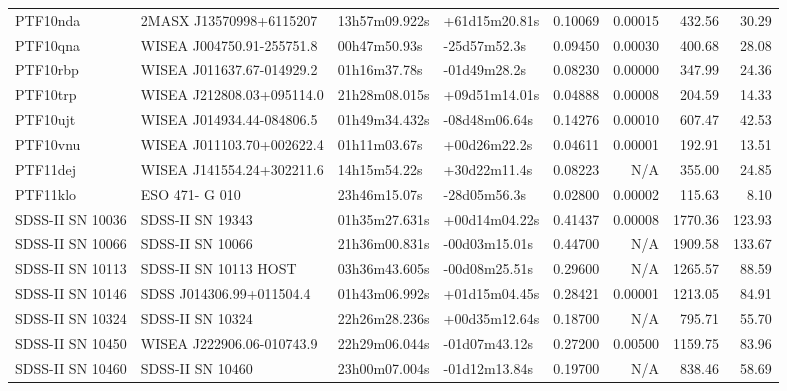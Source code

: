 \begin{longtable}{llllrrrr}
PTF10nda         &         2MASX J13570998+6115207 &   13h57m09.922s &   +61d15m20.81s &  0.10069 &  0.00015 &   432.56 &       30.29 \\
PTF10qna         &       WISEA J004750.91-255751.8 &    00h47m50.93s &    -25d57m52.3s &  0.09450 &  0.00030 &   400.68 &       28.08 \\
PTF10rbp         &       WISEA J011637.67-014929.2 &    01h16m37.78s &    -01d49m28.2s &  0.08230 &  0.00000 &   347.99 &       24.36 \\
PTF10trp         &       WISEA J212808.03+095114.0 &   21h28m08.015s &   +09d51m14.01s &  0.04888 &  0.00008 &   204.59 &       14.33 \\
PTF10ujt         &       WISEA J014934.44-084806.5 &   01h49m34.432s &   -08d48m06.64s &  0.14276 &  0.00010 &   607.47 &       42.53 \\
PTF10vnu         &       WISEA J011103.70+002622.4 &    01h11m03.67s &    +00d26m22.2s &  0.04611 &  0.00001 &   192.91 &       13.51 \\
PTF11dej         &       WISEA J141554.24+302211.6 &    14h15m54.22s &    +30d22m11.4s &  0.08223 &      N/A &   355.00 &       24.85 \\
PTF11klo         &                  ESO 471- G 010 &    23h46m15.07s &    -28d05m56.3s &  0.02800 &  0.00002 &   115.63 &        8.10 \\
SDSS-II SN 10036 &                SDSS-II SN 19343 &   01h35m27.631s &   +00d14m04.22s &  0.41437 &  0.00008 &  1770.36 &      123.93 \\
SDSS-II SN 10066 &                SDSS-II SN 10066 &   21h36m00.831s &   -00d03m15.01s &  0.44700 &      N/A &  1909.58 &      133.67 \\
SDSS-II SN 10113 &           SDSS-II SN 10113 HOST &   03h36m43.605s &   -00d08m25.51s &  0.29600 &      N/A &  1265.57 &       88.59 \\
SDSS-II SN 10146 &        SDSS J014306.99+011504.4 &   01h43m06.992s &   +01d15m04.45s &  0.28421 &  0.00001 &  1213.05 &       84.91 \\
SDSS-II SN 10324 &                SDSS-II SN 10324 &   22h26m28.236s &   +00d35m12.64s &  0.18700 &      N/A &   795.71 &       55.70 \\
SDSS-II SN 10450 &       WISEA J222906.06-010743.9 &   22h29m06.044s &   -01d07m43.12s &  0.27200 &  0.00500 &  1159.75 &       83.96 \\
SDSS-II SN 10460 &                SDSS-II SN 10460 &   23h00m07.004s &   -01d12m13.84s &  0.19700 &      N/A &   838.46 &       58.69 \\

\end{longtable}
